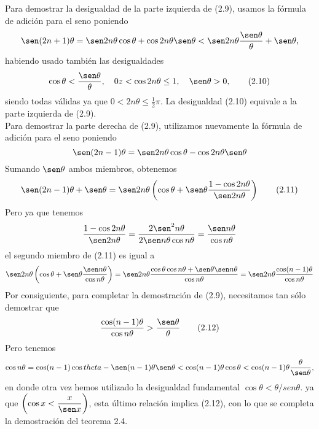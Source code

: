 \begin{teo}
    Para demostrar la desigualdad de la parte izquierda de (2.9), usamos la fórmula de adición para el seno poniendo $$\sen(2n+1)\theta = \sen 2n\theta \cos \theta + \cos 2n\theta \sen \theta < \sen 2n\theta \dfrac{\sen \theta}{\theta} + \sen \theta,$$
    habiendo usado también las desigualdades $$\cos \theta < \dfrac{\sen \theta}{\theta}, \quad 0z<\cos 2n\theta \leq 1, \quad \sen \theta > 0, \qquad \mbox{(2.10)}$$
    siendo todas válidas ya que $0<2n\theta \leq \frac{1}{2}\pi$. La desigualdad (2.10) equivale a la parte izquierda de (2.9).\\
    Para demostrar la parte derecha de (2.9), utilizamos nuevamente la fórmula de adición para el seno poniendo $$\sen(2n-1)\theta = \sen 2n\theta \cos \theta - \cos 2n\theta \sen \theta$$
    Sumando $\sen \theta$ ambos miembros, obtenemos $$\sen(2n-1)\theta + \sen \theta = \sen 2n\theta \left(\cos \theta +\sen \theta \dfrac{1-\cos 2n\theta}{\sen 2n\theta}\right) \qquad \mbox{(2.11)}$$
    Pero ya que tenemos $$\dfrac{1-\cos 2n\theta}{\sen2n\theta}=\dfrac{2\sen^2n\theta}{2\sen n\theta \cos n \theta}=\dfrac{\sen n\theta}{\cos n \theta}$$
    el segundo miembro de (2.11) es igual a $$\sen 2n\theta \left(\cos \theta + \sen \theta \dfrac{\sen n \theta}{\cos n\theta}\right) = \sen 2 n\theta \dfrac{\cos \theta \cos n\theta + \sen \theta \sen n \theta}{\cos n \theta} = \sen 2n\theta \dfrac{\cos (n-1) \theta}{\cos n \theta}$$
    Por consiguiente, para completar la demostración de (2.9), necesitamos tan sólo demostrar que 
    $$\dfrac{\cos(n-1)\theta}{\cos n\theta}>\dfrac{\sen \theta}{\theta} \qquad \mbox{(2.12)}$$
    Pero tenemos $$\cos n\theta = \cos(n-1)\cos theta - \sen(n-1)\theta \sen \theta < \cos(n-1)\theta \cos \theta < \cos(n-1)\theta \dfrac{\theta}{\sen \theta},$$
    en donde otra vez hemos utilizado la desigualdad fundamental $\cos \theta < \theta/sen \theta.$ ya que $\left(\cos x < \dfrac{x}{\sen x}\right)$, esta último relación implica (2.12), con lo que se completa la demostración del teorema 2.4.\\\\

\end{teo}

